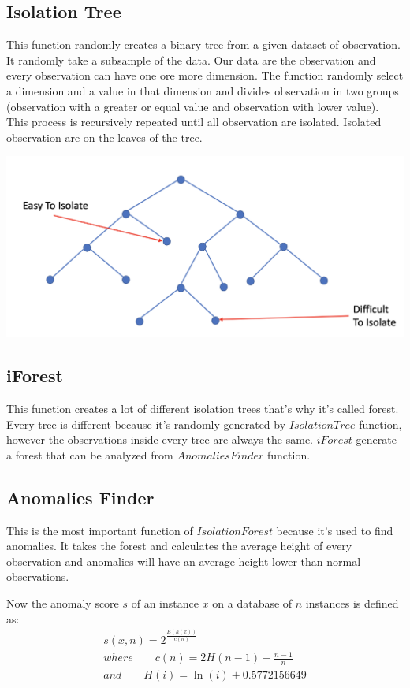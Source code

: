 \documentclass[journal]{IEEEtran}
\begin{document}
\subsection{Isolation Tree}
This function randomly creates a binary tree from a given dataset of observation. It randomly take a subsample of the data. Our data are the observation and every observation can have one ore more dimension.
The function randomly select a dimension and a value in that dimension and divides observation in two groups (observation with a greater or equal value and observation with lower value). This process is recursively repeated until all observation are isolated. Isolated observation are on the leaves of the tree.

\begin{center}
\includegraphics[width=\columnwidth]{albero.png}
\end{center}

\subsection{iForest}
This function creates a lot of different isolation trees that's why it’s called forest. Every tree is different because it’s randomly generated by \(IsolationTree\) function, however the observations inside every tree are always the same. \(iForest\) generate a forest that can be analyzed from \(Anomalies Finder\) function.

\subsection{Anomalies Finder}
This is the most important function of \(Isolation Forest\) because it’s used to find anomalies. It takes the forest and calculates the average height of every observation  and anomalies will have an average height lower than normal observations.

Now the anomaly score \(s\) of an instance \(x\) on a database of \(n\) instances is defined as:
\begin{gather*}
s(x,n)=2^ { \frac {{E(h(x))}} {c(n)} } \\
where \qquad c(n)=2H(n - 1) - \frac{n - 1}{n} \\
and \qquad H(i)=\ln (i) + 0.5772156649
\end{gather*}
\end{document}
